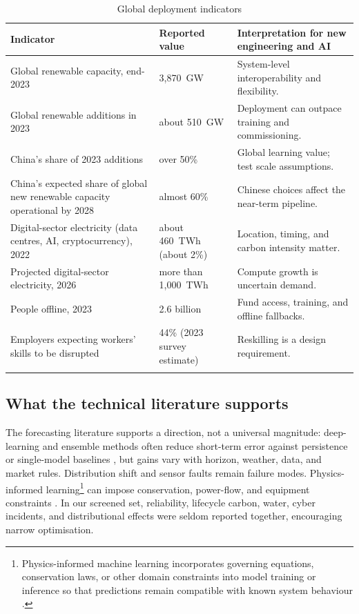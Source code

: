\documentclass[12pt]{article}
\begin{document}
\begin{table}[H]\small
\caption{Global deployment indicators}\label{tab:global}
\begin{tabularx}{\textwidth}{@{}L{0.30\textwidth}C{0.18\textwidth}Y@{}}
\toprule
\textbf{Indicator} & \textbf{Reported value} & \textbf{Interpretation for new engineering and AI}\\
\midrule
Global renewable capacity, end-2023 & 3,870~GW & System-level interoperability and flexibility.\\
Global renewable additions in 2023 & about 510~GW & Deployment can outpace training and commissioning.\\
China's share of 2023 additions & over 50\% & Global learning value; test scale assumptions.\\
China's expected share of global new renewable capacity operational by 2028 & almost 60\% & Chinese choices affect the near-term pipeline.\\
Digital-sector electricity (data centres, AI, cryptocurrency), 2022 & about 460~TWh (about 2\%) & Location, timing, and carbon intensity matter.\\
Projected digital-sector electricity, 2026 & more than 1,000~TWh & Compute growth is uncertain demand.\\
People offline, 2023 & 2.6 billion & Fund access, training, and offline fallbacks.\\
Employers expecting workers' skills to be disrupted & 44\% (2023 survey estimate) & Reskilling is a design requirement.\\
\bottomrule
{}
\end{tabularx}
\end{table}


\subsection{What the technical literature supports}
The forecasting literature supports a direction, not a universal magnitude: deep-learning and ensemble methods often reduce short-term error against persistence or single-model baselines \cite{irena2024}, but gains vary with horizon, weather, data, and market rules. Distribution shift and sensor faults remain failure modes. Physics-informed learning\footnote{Physics-informed machine learning incorporates governing equations, conservation laws, or other domain constraints into model training or inference so that predictions remain compatible with known system behaviour \cite{karniadakis2021}.} can impose conservation, power-flow, and equipment constraints \cite{karniadakis2021}. In our screened set, reliability, lifecycle carbon, water, cyber incidents, and distributional effects were seldom reported together, encouraging narrow optimisation.
\end{document}

